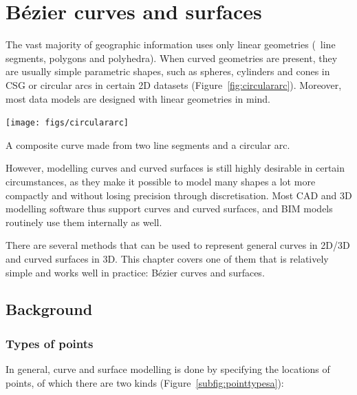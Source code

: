 
\setchapterpreamble[u]{\margintoc}

\graphicspath{{curves/}}

\chapter{B\'ezier curves and surfaces}
\label{chap:curves}

The vast majority of geographic information uses only linear geometries (\ie\ line segments, polygons and polyhedra).
When curved geometries are present, they are usually simple parametric shapes, such as spheres, cylinders and cones in CSG or circular arcs in certain 2D datasets (Figure~\ref{fig:circulararc}).
Moreover, most data models are designed with linear geometries in mind.

\begin{marginfigure}
\centering
\texttt{[image: figs/circulararc]}
\caption{A composite curve made from two line segments and a circular arc.}%
\label{fig:circulararc}
\end{marginfigure}

However, modelling curves and curved surfaces is still highly desirable in certain circumstances, as they make it possible to model many shapes a lot more compactly and without losing precision through discretisation.
Most CAD and 3D modelling software thus support curves and curved surfaces, and BIM models routinely use them internally as well.

There are several methods that can be used to represent general curves in 2D/3D and curved surfaces in 3D.
This chapter covers one of them that is relatively simple and works well in practice: B\'ezier curves and surfaces.

\section{Background}

\subsection{Types of points}

In general, curve and surface modelling is done by specifying the locations of points, of which there are two kinds (Figure~\ref{subfig:pointtypesa}):

